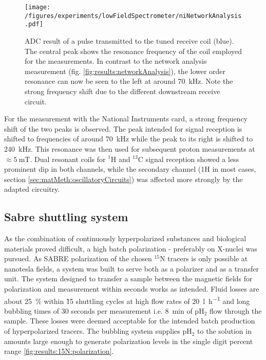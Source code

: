             \begin{figure}
                \texttt{[image: /figures/experiments/lowFieldSpectrometer/niNetworkAnalysis.pdf]}
                \caption[Network analysis NI card]{ADC result of a pulse transmitted to the tuned receive coil (blue). The central peak shows the resonance frequency of the coil employed for the measurements. In contrast to the network analysis measurement (fig. \ref{fig:results:networkAnalysis}), the lower  order resonance can now be seen to the left at around \SI{70}{\kilo\hertz}. Note the strong frequency shift due to the different downstream receive circuit.}
                \label{fig:results:niNetworkAnalysis}
            \end{figure}
            For the measurement with the National Instruments card, a strong frequency shift of the two peaks is observed. The peak intended for signal reception is shifted to frequencies of around \SI{70}{\kilo\hertz} while the peak to its right is shifted to \SI{240}{\kilo\hertz}. This resonance was then used for subsequent proton measurements at $\approx\SI{5}{\milli\tesla}$. Dual resonant coils for $^{1}$H and $^{13}$C signal reception showed a less prominent dip in both channels, while the secondary channel (1H in most cases, section \ref{sec:matMeth:oscillatoryCircuits}) was affected more strongly by the adapted circuitry.
    \subsection{Sabre shuttling system}
    As the combination of continuously hyperpolarized substances and biological materials proved difficult, a high batch polarization - preferably on X-nuclei was pursued. As SABRE polarization of the chosen $^{15}$N tracers is only possible at nanotesla fields, a system was built to serve both as a polarizer and as a transfer unit. The system designed to transfer a sample between the magnetic fields for polarization and measurement within seconds works as intended. Fluid losses are about \SI{25}{\percent} within \~15 shuttling cycles at high flow rates of \SI{20}{\litre \per\hour} and long bubbling times of 30 seconds per measurement i.e. \SI{8}{\minute} of pH$_2$ flow through the sample. These losses were deemed acceptable for the intended batch production of hyperpolarized tracers. The bubbling system supplies pH$_2$ to the solution in amounts large enough to generate polarization levels in the single digit percent range \ref{fig:results:15N:polarization}.
